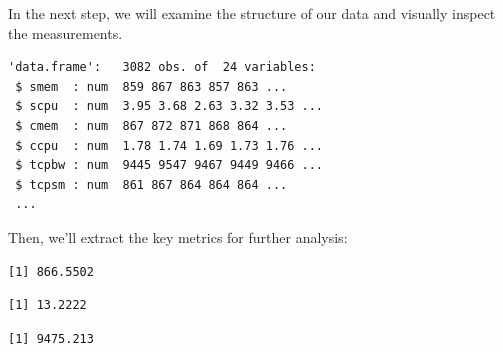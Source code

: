 In the next step, we will examine the structure of our data and visually
inspect the measurements.

\begin{Shaded}
\begin{Highlighting}[]
\end{Highlighting}
\end{Shaded}

\begin{verbatim}
'data.frame':   3082 obs. of  24 variables:
 $ smem  : num  859 867 863 857 863 ...
 $ scpu  : num  3.95 3.68 2.63 3.32 3.53 ...
 $ cmem  : num  867 872 871 868 864 ...
 $ ccpu  : num  1.78 1.74 1.69 1.73 1.76 ...
 $ tcpbw : num  9445 9547 9467 9449 9466 ...
 $ tcpsm : num  861 867 864 864 864 ...
 ...
\end{verbatim}

Then, we'll extract the key metrics for further analysis:

\begin{Shaded}
\begin{Highlighting}[]
\SpecialCharTok{\$}
\end{Highlighting}
\end{Shaded}

\begin{verbatim}
[1] 866.5502
\end{verbatim}

\begin{Shaded}
\begin{Highlighting}[]
\SpecialCharTok{\$}
\end{Highlighting}
\end{Shaded}

\begin{verbatim}
[1] 13.2222
\end{verbatim}

\begin{Shaded}
\begin{Highlighting}[]
\SpecialCharTok{\$}
\end{Highlighting}
\end{Shaded}

\begin{verbatim}
[1] 9475.213
\end{verbatim}

\begin{Shaded}
\begin{Highlighting}[]
\SpecialCharTok{\$}
\end{Highlighting}
\end{Shaded}

